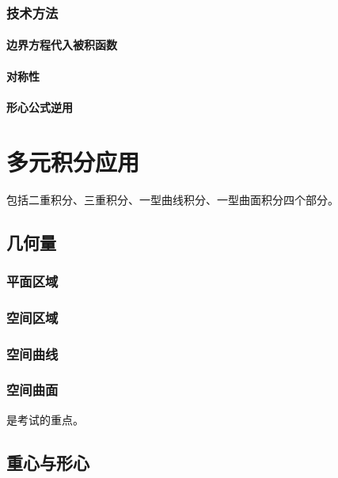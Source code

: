 \documentclass[UTF8, 12pt]{ctexart}
\begin{document}
\subsubsection{技术方法}

\paragraph{边界方程代入被积函数} \leavevmode \medskip

\paragraph{对称性} \leavevmode \medskip

\paragraph{形心公式逆用} \leavevmode \medskip

\section{多元积分应用}

包括二重积分、三重积分、一型曲线积分、一型曲面积分四个部分。

\subsection{几何量}

\subsubsection{平面区域}

\subsubsection{空间区域}

\subsubsection{空间曲线}

\subsubsection{空间曲面}

是考试的重点。

\subsection{重心与形心}
\end{document}
